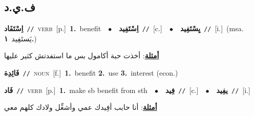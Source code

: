\documentclass[10pt,a4paper,twoside]{article} %
\begin{document}
\begin{multicols}{2}
\vspace{-3mm}
\subsection*{\color{blue}\foreignlanguage{arabic}{ف.ي.د}\color{blue}{}} 

{\setlength\topsep{0pt}\textbf{\foreignlanguage{arabic}{اِسْتَفَاد}}\ {\color{gray}\texttt{//}\color{black}}\ \textsc{verb}\ [p.]\ \textbf{1.}~benefit\ \ $\bullet$\ \ \setlength\topsep{0pt}\textbf{\foreignlanguage{arabic}{اِسْتَفِيد}}\ {\color{gray}\texttt{//}\color{black}}\ [c.]\ \ $\bullet$\ \ \setlength\topsep{0pt}\textbf{\foreignlanguage{arabic}{يِسْتَفِيد}}\ {\color{gray}\texttt{//}\color{black}}\ [i.]\ \color{gray}(msa. \foreignlanguage{arabic}{يَستَفِيد}~\foreignlanguage{arabic}{\textbf{١.}})\color{black}\  \begin{flushright}\color{gray}\foreignlanguage{arabic}{\textbf{\underline{\foreignlanguage{arabic}{أمثلة}}}: أخذت حبة أكامول بس ما استفدتش كثير عليها}\end{flushright}\color{black}} \vspace{2mm}

{\setlength\topsep{0pt}\textbf{\foreignlanguage{arabic}{فَائِدِة}}\ {\color{gray}\texttt{//}\color{black}}\ \textsc{noun}\ [f.]\ \textbf{1.}~benefit  \textbf{2.}~use  \textbf{3.}~interest (econ.)\ } \vspace{2mm}

{\setlength\topsep{0pt}\textbf{\foreignlanguage{arabic}{فَاد}}\ {\color{gray}\texttt{//}\color{black}}\ \textsc{verb}\ [p.]\ \textbf{1.}~make sb benefit from sth\ \ $\bullet$\ \ \setlength\topsep{0pt}\textbf{\foreignlanguage{arabic}{فِيد}}\ {\color{gray}\texttt{//}\color{black}}\ [c.]\ \ $\bullet$\ \ \setlength\topsep{0pt}\textbf{\foreignlanguage{arabic}{يفِيد}}\ {\color{gray}\texttt{//}\color{black}}\ [i.]\  \begin{flushright}\color{gray}\foreignlanguage{arabic}{\textbf{\underline{\foreignlanguage{arabic}{أمثلة}}}: أنا حابب أفِيدك عمي وأشغِّل ولادك كلهم معي}\end{flushright}\color{black}} \vspace{2mm}


\end{multicols}
\end{document}
